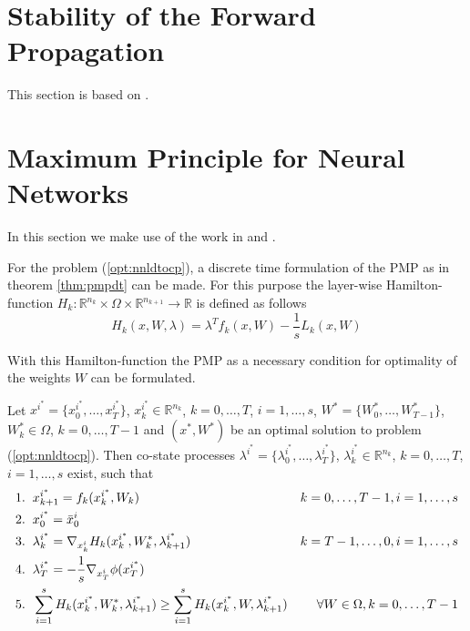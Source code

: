 \documentclass[a4paper, 12pt]{scrreprt} %
\begin{document}
\section{Stability of the Forward Propagation}
This section is based on \cite{safdnn}.


\section{Maximum Principle for Neural Networks}
In this section we make use of the work in \cite{aocatdl} and \cite{mpbafdl}.

For the problem (\ref{opt:nnldtocp}), a discrete time formulation of the \ac{PMP} as in theorem \ref{thm:pmpdt} can be made. For this purpose the layer-wise Hamilton-function $H_k: \mathbb{R}^{n_{k}} \times \Omega \times\mathbb{R}^{n_{k+1}} \to \mathbb{R} $ is defined as follows
\begin{equation}
H_k(x,W,\lambda) = \lambda^T f_k(x,W) - \frac{1}{s} L_k(x,W)
\label{eq:hamlw}
\end{equation}

With this Hamilton-function the \ac{PMP} as a necessary condition for optimality of the weights $W$ can be formulated.

\begin{myTheorem}
\label{thm:pmpnn}
Let $x^{i^*}=\{x_0^{i^*}, \dots,x_T^{i^*}\}$, $x_k^{i^*} \in \mathbb R^{n_k}$, $k = 0,\dots, T$, $i=1,\dots,s$, $W^* = \{W_0^*, \dots,W_{T-1}^*\}$, $W_k^*\in \Omega$, $k = 0, \dots, T-1$ and $(x^*,W^*)$ be an optimal solution to problem (\ref{opt:nnldtocp}). Then co-state processes $\lambda^{i^*} = \{\lambda_0^{i^*}, \dots, \lambda_T^{i^*}\}$, $\lambda_k^{i^*} \in \mathbb R^{n_k}$, $k=0,\dots,T$, $i=1,\dots,s$ exist, such that
\begin{align*}
1.&\hspace{0.2cm} x_{k+1}^{i^*} =  f_k(x_k^{i^*},W_k) &k=0,\dots,T-1, i=1,\dots,s \\
2.&\hspace{0.2cm} x_0^{i^*} = \bar x_0^i \\
3.&\hspace{0.2cm} \lambda_k^{i^*} = \nabla_{x_k^i} H_k(x_k^{i^*},W^*_k,\lambda_{k+1}^{i^*}) & k=T-1, \dots, 0, i=1,\dots,s \\
4.&\hspace{0.2cm} \lambda_T^{i^*} = - \frac{1}{s} \nabla_{x^i_T} \phi(x_T^{i^*}) \\
5.&\hspace{0.2cm} \sum_{i=1}^s{H_k(x_k^{i^*},W^*_k,\lambda_{k+1}^{i^*})} \geq \sum_{i=1}^s{H_k(x_k^{i^*},W,\lambda_{k+1}^{i^*})} & \forall W \in \Omega, k = 0,\dots, T-1
\end{align*}
\end{myTheorem}
\end{document}
